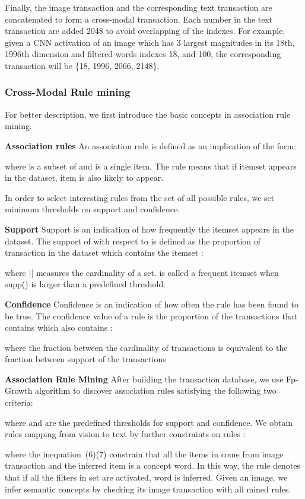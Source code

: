 \documentclass[sigconf]{acmart}
\begin{document}
Finally, the image transaction and the corresponding text transaction are concatenated to form a cross-modal transaction. Each number in the text transaction are added 2048 to avoid overlapping of the indexes. For example, given a CNN activation of an image which has 3 largest magnitudes in its 18th, 1996th dimension and filtered words indexes 18, and 100, the corresponding transaction  will be \{18, 1996, 2066, 2148\}.

\subsubsection{Cross-Modal Rule mining} For better description, we first introduce the basic concepts in association rule mining. 

\textbf{Association rules}
 An association rule is defined as an implication of the form: 
 
 where  is a subset of  and  is a single item. The rule means that if itemset  appears in the dataset, item  is also likely to appear.
 
In order to select interesting rules from the set of all possible rules, we set minimum thresholds on support and confidence.

\textbf{Support} Support is an indication of how frequently the itemset appears in the dataset. The support of  with respect to  is defined as the proportion of transaction  in the dataset  which contains the itemset :

where || measures the cardinality of a set.  is called a frequent itemset when supp() is larger than a predefined threshold.

\textbf{Confidence} Confidence is an indication of how often the rule has been found to be true. The confidence value of a rule is the proportion of the transactions that contains   which also contains :

where the fraction between the cardinality of transactions is equivalent to the fraction between support of the transactions 
 
\textbf{Association Rule Mining}
After building the transaction database, we use Fp-Growth algorithm\cite{han2000mining} to discover association rules satisfying the following two criteria: 

where  and  are the predefined thresholds for support and confidence. We obtain rules mapping from vision to text by further constraints on rules :

where the inequation~(6)(7) constrain that all the items in  come from image transaction and the inferred item is a concept word.
In this way, the rule  denotes that if all the filters in set  are activated, word  is inferred. Given an image, we infer semantic concepts by checking its image transaction with all mined rules. 
\end{document}
